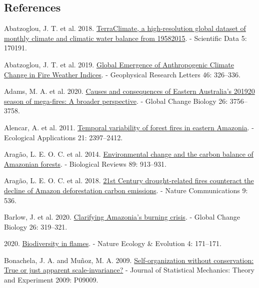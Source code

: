 \documentclass[
]{article}
\newlength{\cslhangindent}
\newenvironment{CSLReferences}[2] %
 {\begin{list}{}{%
  \setlength{\itemindent}{0pt}
  \setlength{\leftmargin}{0pt}
  \setlength{\parsep}{0pt}
  \ifodd #1
   \setlength{\leftmargin}{\cslhangindent}
   \setlength{\itemindent}{-1\cslhangindent}
  \fi
  \setlength{\itemsep}{#2\baselineskip}}}
 {\end{list}}
\begin{document}
\subsection*{References}\label{references}

\label{refs}
\begin{CSLReferences}{1}{1}
Abatzoglou, J. T. et al. 2018.
\href{https://doi.org/10.1038/sdata.2017.191}{{TerraClimate}, a
high-resolution global dataset of monthly climate and climatic water
balance from 1958{\textendash}2015}. - Scientific Data 5: 170191.

Abatzoglou, J. T. et al. 2019.
\href{https://doi.org/10.1029/2018GL080959}{Global {Emergence} of
{Anthropogenic Climate Change} in {Fire Weather Indices}}. - Geophysical
Research Letters 46: 326--336.

Adams, M. A. et al. 2020.
\href{https://doi.org/10.1111/gcb.15125}{Causes and consequences of
{Eastern Australia}'s 2019{\textendash}20 season of mega-fires: {A}
broader perspective}. - Global Change Biology 26: 3756--3758.

Alencar, A. et al. 2011.
\href{https://doi.org/10.1890/10-1168.1}{Temporal variability of forest
fires in eastern {Amazonia}}. - Ecological Applications 21: 2397--2412.

Aragão, L. E. O. C. et al. 2014.
\href{https://doi.org/10.1111/brv.12088}{Environmental change and the
carbon balance of {Amazonian} forests}. - Biological Reviews 89:
913--931.

Aragão, L. E. O. C. et al. 2018.
\href{https://doi.org/10.1038/s41467-017-02771-y}{21st {Century}
drought-related fires counteract the decline of {Amazon} deforestation
carbon emissions}. - Nature Communications 9: 536.

Barlow, J. et al. 2020.
\href{https://doi.org/10.1111/gcb.14872}{Clarifying {Amazonia}'s burning
crisis}. - Global Change Biology 26: 319--321.

2020. \href{https://doi.org/10.1038/s41559-020-1119-4}{Biodiversity in
flames}. - Nature Ecology \& Evolution 4: 171--171.

Bonachela, J. A. and Muñoz, M. A. 2009.
\href{https://doi.org/10.1088/1742-5468/2009/09/P09009}{Self-organization
without conservation: True or just apparent scale-invariance?} - Journal
of Statistical Mechanics: Theory and Experiment 2009: P09009.


\end{CSLReferences}
\end{document}
